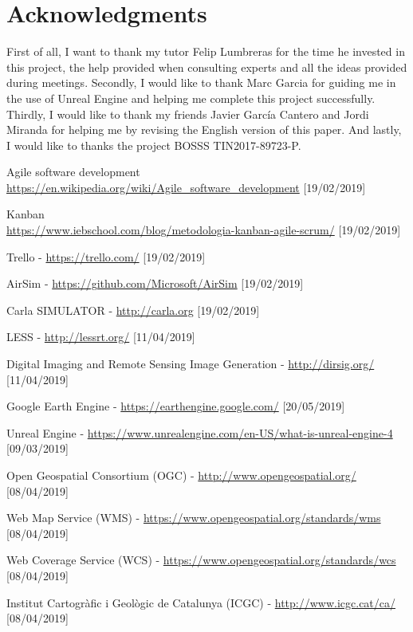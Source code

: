 \documentclass[10pt,a4paper,twocolumn,twoside]{article}
\begin{document}
\section*{Acknowledgments}

First of all, I want to thank  my tutor Felip Lumbreras for the time he invested in this project, the help provided when consulting experts and all the ideas provided during meetings. Secondly, I would like to thank Marc Garcia for guiding me in the use of Unreal Engine and helping me complete this project successfully. Thirdly, I would like to thank my friends Javier García Cantero and Jordi Miranda for helping me by revising the English version of this paper. And lastly, I would like to thanks the project BOSSS TIN2017-89723-P.

\begin{thebibliography}{11}
Agile software development
\\ \url{https://en.wikipedia.org/wiki/Agile_software_development}
[19/02/2019]
 
Kanban
\\ \url{https://www.iebschool.com/blog/metodologia-kanban-agile-scrum/} [19/02/2019]

Trello - \url{https://trello.com/} [19/02/2019]

AirSim - \url{https://github.com/Microsoft/AirSim} [19/02/2019]

Carla SIMULATOR - \url{http://carla.org} [19/02/2019]

LESS - \url{http://lessrt.org/} [11/04/2019]

Digital Imaging and Remote Sensing Image Generation - \url{http://dirsig.org/} [11/04/2019]

Google Earth Engine - \url{https://earthengine.google.com/} [20/05/2019]

Unreal Engine - \url{https://www.unrealengine.com/en-US/what-is-unreal-engine-4} [09/03/2019]

Open Geospatial Consortium (OGC) -  \url{http://www.opengeospatial.org/} [08/04/2019]

Web Map Service (WMS) -  \url{https://www.opengeospatial.org/standards/wms} [08/04/2019]

Web Coverage Service (WCS) -  \url{https://www.opengeospatial.org/standards/wcs} [08/04/2019]

Institut Cartogràfic i Geològic de Catalunya (ICGC) - \url{http://www.icgc.cat/ca/} [08/04/2019]


\end{thebibliography}
\end{document}

